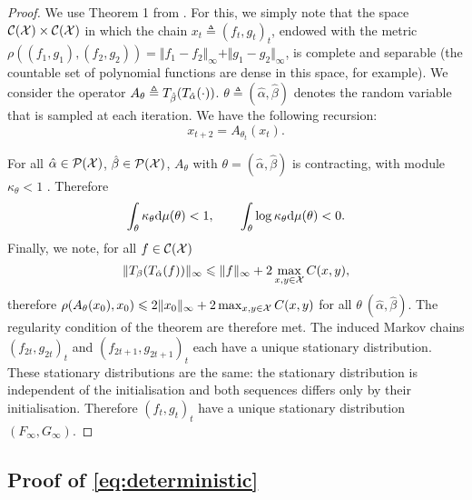 \begin{proof}
    We use Theorem 1 from \citet{diaconis_iterated}. For this, we simply note
    that the space $\mathcal{C}(\mathcal{X}) \times \mathcal{C}(\mathcal{X})$ in which the chain ${x_t
    \triangleq (f_t, g_t)}_t$, endowed with the metric $\rho((f_1, g_1), (f_2,
    g_2)) = \Vert f_1 - f_2 \Vert_{\infty} + \Vert g_1 - g_2 \Vert_{\infty}$, is
    complete and separable (the countable set of polynomial functions are dense in this space, for example).
    We consider the operator $A_{\theta} \triangleq T_{\hat \beta}(T_{\hat
    \alpha}(\cdot))$. $\theta \triangleq (\hat \alpha, \hat \beta)$ denotes
    the random variable that is sampled at each iteration. We have the following
    recursion:
    \begin{equation}
        x_{t+2} = A_{\theta_t}(x_t).
    \end{equation}
    
    For all $\hat \alpha \in \mathcal{P}(\mathcal{X})$, $\hat \beta \in \mathcal{P}(\mathcal{X})$, $A_{\theta}$
    with $\theta = (\hat \alpha, \hat \beta)$ is contracting, with module
    $\kappa_\theta < 1$ \citep{peyre2019computational} . Therefore
    \begin{equation}
        \int_{\theta} \kappa_\theta \textrm{d} \mu(\theta) < 1, \qquad \int_{\theta}
         \log \kappa_\theta \textrm{d} \mu(\theta) < 0.
    \end{equation}
    Finally, we note, for all $f \in \mathcal{C}(\mathcal{X})$
    \begin{equation}
        \Vert T_{\beta}(T_{\hat \alpha}(f)) \Vert_{\infty} 
        \leqslant \Vert f \Vert_\infty + 2 \max_{x,y \in \mathcal{X}} C(x, y),
    \end{equation}
    therefore $\rho(A_\theta(x_0), x_0) \leqslant 2 \Vert x_0 \Vert_\infty + 2
    \max_{x,y \in \mathcal{X}} C(x, y)$ for all $\theta \ (\hat \alpha, \hat \beta)$.
    The regularity condition of the theorem are therefore met. The induced Markov chains ${(f_{2t},
    g_{2t})}_t$ and ${(f_{2t + 1}, g_{2t + 1})}_t$ each have a unique stationary
    distribution. These stationary distributions are the same: the stationary distribution is independent of the initialisation and both sequences differs only by their initialisation.
    Therefore ${(f_{t}, g_{t})}_t$ have a unique stationary distribution
    $(F_\infty, G_\infty)$.
\end{proof}

\subsection{Proof of \autoref{eq:deterministic}}

